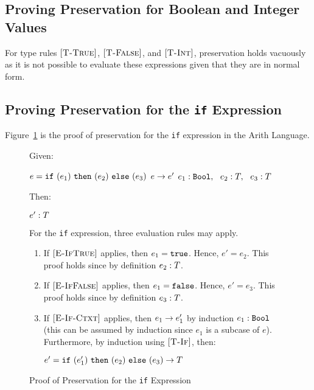 \documentclass{report}
\newcommand{\rel}[1]{ \mbox{\sc [#1]} }
\begin{document}
\subsection{Proving Preservation for Boolean and Integer Values}

For type rules $\rel{T-True}$, $\rel{T-False}$, and $\rel{T-Int}$, preservation holds vacuously as it is not possible to evaluate these expressions given that they are in normal form.

\subsection{Proving Preservation for the \texttt{if} Expression}

Figure~\ref{fig:ifProofPreservation} is the proof of preservation for the \texttt{if} expression in the Arith Language.

\begin{figure}[ht!]
Given:
\begin{center}
   $e = \mbox{\tt if}~({e_1})~\mbox{\tt then}~({e_2})~\mbox{\tt else}~({e_3})$
   ${e} \rightarrow {e'}$
   ${e_1} : {\mbox{\tt Bool}},~~{e_2} : {T},~~{e_3} : {T}$
\end{center}
Then:
\begin{center}
   ${e'} : {T}$
\end{center}
For the \texttt{if} expression, three evaluation rules may apply.
\begin{enumerate}

    \item If $\rel{E-IfTrue}$ applies, then $e_1 = \mbox{\tt true}$.  Hence, $e' = e_2$.  This proof holds since by definition ${e_2} : {T}$.
      
    \item If $\rel{E-IfFalse}$ applies, then $e_1 = \mbox{\tt false}$.  Hence, $e' = e_3$.  This proof holds since by definition ${e_3} : {T}$.
    
    \item If $\rel{E-If-Ctxt}$ applies, then ${e_1} \rightarrow {e'_1}$ by induction ${e_1} : {\mbox{\tt Bool}}$ (this can be assumed by induction since $e_1$ is a subcase of $e$).  Furthermore, by induction using $\rel{T-If}$, then:
    
    \begin{center}
      ${e' = \mbox{\tt if}~({e'_1})~\mbox{\tt then}~({e_2})~\mbox{\tt else}~({e_3})} \rightarrow {T}$
    \end{center}
	
	\end{enumerate}
	
  \caption{Proof of Preservation for the \texttt{if} Expression}\label{fig:ifProofPreservation}
\end{figure} 
\end{document}
